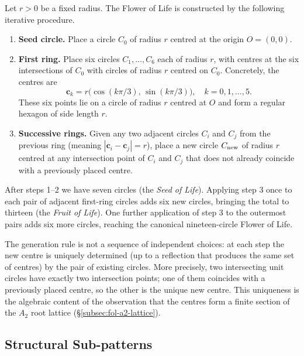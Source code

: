 Let \(r > 0\) be a fixed radius.  The Flower of Life is constructed by
the following iterative procedure.

\begin{enumerate}
\item \textbf{Seed circle.}  Place a circle \(C_0\) of radius \(r\) centred at
      the origin \(O = (0,0)\).
\item \textbf{First ring.}  Place six circles \(C_1,\ldots,C_6\) each of radius
      \(r\), with centres at the six intersections of \(C_0\) with circles of
      radius \(r\) centred on \(C_0\).  Concretely, the centres are
      \[
        \mathbf{c}_k = r\bigl(\cos(k\pi/3),\,\sin(k\pi/3)\bigr),\quad k=0,1,\ldots,5.
      \]
      These six points lie on a circle of radius \(r\) centred at \(O\) and
      form a regular hexagon of side length \(r\).
\item \textbf{Successive rings.}  Given any two adjacent circles \(C_i\) and
      \(C_j\) from the previous ring (meaning \(|\mathbf{c}_i - \mathbf{c}_j| = r\)),
      place a new circle \(C_{\rm new}\) of radius \(r\) centred at any
      intersection point of \(C_i\) and \(C_j\) that does not already coincide
      with a previously placed centre.
\end{enumerate}

After steps 1–2 we have seven circles (the \emph{Seed of Life}).
Applying step 3 once to each pair of adjacent first-ring circles adds
six new circles, bringing the total to thirteen (the \emph{Fruit of Life}).
One further application of step 3 to the outermost pairs adds six more
circles, reaching the canonical nineteen-circle Flower of Life.

\begin{remark}
The generation rule is not a sequence of independent choices:
at each step the new centre is uniquely determined (up to a reflection that
produces the same set of centres) by the pair of existing circles.
More precisely, two intersecting unit circles have exactly two intersection
points; one of them coincides with a previously placed centre, so the other
is the unique new centre.  This uniqueness is the algebraic content of the
observation that the centres form a finite section of the
\(A_2\) root lattice (§\ref{subsec:fol-a2-lattice}).
\end{remark}

\subsection{Structural Sub-patterns}
\label{subsec:fol-subpatterns}

